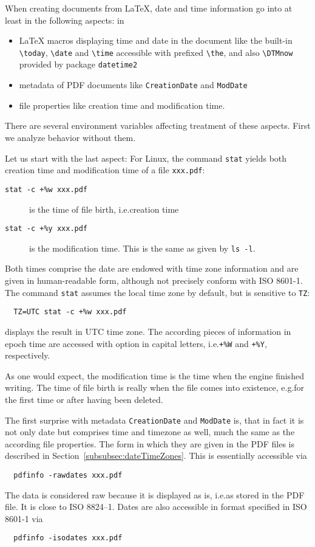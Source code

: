 \documentclass[a4paper, english]{article}%
\newcommand{\cmd}[1]{\texttt{\textbackslash#1}}
\begin{document}
When creating documents from \LaTeX, 
date and time information go into at least in the following aspects: in 
%
\begin{itemize}
\item 
\LaTeX{} macros displaying time and date in the document 
like the built-in \cmd{today}, \cmd{date} and \cmd{time} 
accessible with prefixed \cmd{the}, 
and also \cmd{DTMnow} provided by package \texttt{datetime2} 
\item 
metadata of PDF documents like \texttt{CreationDate} 
and \texttt{ModDate}
\item 
file properties like creation time and modification time. 
\end{itemize}

There are several environment variables affecting treatment of these aspects. 
First we analyze behavior without them. 

Let us start with the last aspect: 
For Linux, the command \texttt{stat} 
yields both creation time and modification time of a file \texttt{xxx.pdf}: 
%
\begin{description}
  \item[\texttt{stat -c +\%w xxx.pdf}] is the time of file birth, i.e.\@ creation time 
  \item[\texttt{stat -c +\%y xxx.pdf}] is the modification time. 
  This is the same as given by \texttt{ls -l}. 
\end{description}
%
Both times comprise the date 
are endowed with time zone information and are given in human-readable form, 
although not precisely conform with ISO 8601-1. 
The command \texttt{stat} assumes the local time zone by default, 
but is sensitive to \texttt{TZ}: 
%
\begin{verbatim}
  TZ=UTC stat -c +%w xxx.pdf
\end{verbatim}
%
displays the result in UTC time zone. 
The according pieces of information in epoch time 
are accessed with option in capital letters, 
i.e.\@ \texttt{+\%W} and \texttt{+\%Y}, respectively. 
\medskip


As one would expect, the modification time is the time when the engine finished writing. 
The time of file birth is really when the file comes into existence, 
e.g.\@ for the first time or after having been deleted. 

The first surprise with metadata \texttt{CreationDate} and \texttt{ModDate} is, 
that in fact it is not only date but comprises time and timezone as well, 
much the same as the according file properties. 
The form in which they are given in the PDF files 
is described in Section~\ref{subsubsec:dateTimeZones}. 
This is essentially accessible via 
%
\begin{verbatim}
  pdfinfo -rawdates xxx.pdf
\end{verbatim}
%
The data is considered raw because it is displayed as is, i.e.\@ as stored in the PDF file. 
It is close to ISO 8824--1. 
Dates are also accessible in format specified in ISO 8601-1 via 
%
\begin{verbatim}
  pdfinfo -isodates xxx.pdf
\end{verbatim}
\end{document}
